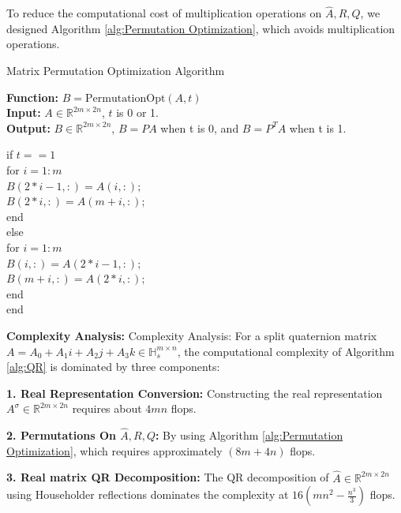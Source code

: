 \documentclass[5p]{elsarticle}
\numberwithin{equation}{section}
\begin{document}
To reduce the computational cost of multiplication operations on $\hat{A}, R, Q$, we designed Algorithm \ref{alg:Permutation Optimization}, which avoids multiplication operations.
\begin{algorithm}[htbp]
    \caption{Matrix Permutation Optimization Algorithm}
    \label{alg:Permutation Optimization}
    \textbf{Function:} $B=\text{PermutationOpt}(A,t)$\\
    \textbf{Input:} \indent  $ A\in \mathbb{R}^{2m\times 2n}$, $t$ is 0 or 1. \\
    {\textbf{Output:}}  $B \in\mathbb{R}^{2m\times 2n}$, $B=PA$ when t is 0, and $B=P^TA$ when t is 1.
          \begin{algorithmic}
          \raggedright 
          \item[] if $t == 1$\\
          \quad for $i = 1:m$\\
          \qquad $B(2*i-1, :) = A(i, :);$\\
          \qquad $B(2*i, :) = A(m+i, :);$\\
          \quad end\\
          \noindent else\\
          \quad for $i = 1:m$\\
          \qquad $B(i, :) = A(2*i-1, :);$\\
          \qquad $B(m+i, :) = A(2*i, :);$\\
          \quad end\\
          end
          \end{algorithmic}
\end{algorithm}


\textbf{Complexity Analysis:}
{Complexity Analysis:} For a split quaternion matrix $A = A_0 + A_1i + A_2j + A_3k \in \mathbb{H}_s^{m \times n}$, the computational complexity of Algorithm \ref{alg:QR} is dominated by three components:  

\textbf{1. Real Representation Conversion:}
Constructing the real representation $A^\sigma \in \mathbb{R}^{2m \times 2n}$ requires about $4mn$ flops. 

\textbf{2. Permutations On $\hat{A}, R, Q$:}
By using Algorithm \ref{alg:Permutation Optimization},  which requires approximately  $(8m+4n)$ flops.


\textbf{3. Real matrix QR Decomposition:}
The QR decomposition of $\hat{A} \in \mathbb{R}^{2m \times 2n}$ using Householder reflections dominates the complexity at $16(mn^2-\frac{n^3}{3})$ flops.
\end{document}
